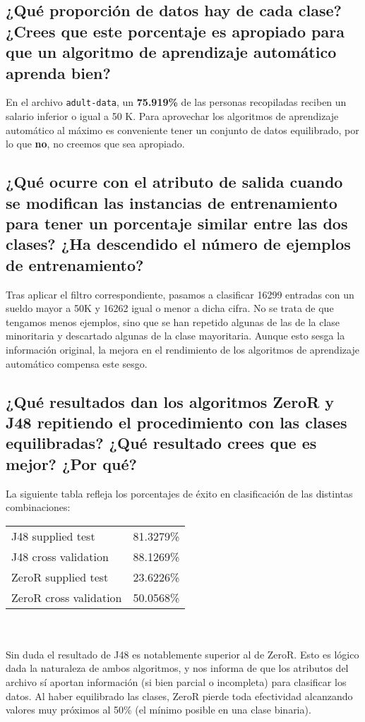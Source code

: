 \documentclass[12pt]{article}
\begin{document}
\subsection*{\small ¿Qué proporción de datos hay de cada clase? ¿Crees que este
porcentaje es apropiado para que un algoritmo de aprendizaje automático aprenda
bien?}

En el archivo \texttt{adult-data}, un \textbf{75.919\%} de las personas
recopiladas reciben un salario inferior o igual a 50 K. Para aprovechar los
algoritmos de aprendizaje automático al máximo es conveniente tener un conjunto
de datos equilibrado, por lo que \textbf{no}, no creemos que sea apropiado.

\subsection*{\small ¿Qué ocurre con el atributo de salida cuando se modifican
las instancias de entrenamiento para tener un porcentaje similar entre las dos
clases? ¿Ha descendido el número de ejemplos de entrenamiento?}

Tras aplicar el filtro correspondiente, pasamos a clasificar 16299 entradas con
un sueldo mayor a 50K y 16262 igual o menor a dicha cifra. No se trata de que
tengamos menos ejemplos, sino que se han repetido algunas de las de la clase
minoritaria y descartado algunas de la clase mayoritaria. Aunque esto sesga la
información original, la mejora en el rendimiento de los algoritmos de
aprendizaje automático compensa este sesgo.

\subsection*{\small ¿Qué resultados dan los algoritmos ZeroR y J48 repitiendo
el procedimiento con las clases equilibradas? ¿Qué resultado crees que
es mejor? ¿Por qué?}

La siguiente tabla refleja los porcentajes de éxito en clasificación de las
distintas combinaciones:\\

\begin{tabular}{ll}
    J48 supplied test & 81.3279\%\\
    J48 cross validation & 88.1269\%\\
    ZeroR supplied test & 23.6226\%\\
    ZeroR cross validation & 50.0568\%\\
\end{tabular}
\\ \\
Sin duda el resultado de J48 es notablemente superior al de ZeroR. Esto es
lógico dada la naturaleza de ambos algoritmos, y nos informa de que los
atributos del archivo sí aportan información (si bien parcial o incompleta)
para clasificar los datos. Al haber equilibrado las clases, ZeroR pierde toda
efectividad alcanzando valores muy próximos al 50\% (el mínimo posible en una
clase binaria).
\end{document}

